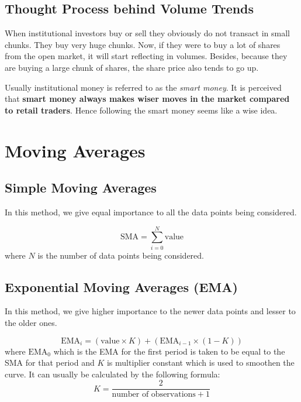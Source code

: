 
\subsection{Thought Process behind Volume Trends}
When institutional investors buy or sell they obviously do not transact in small chunks. They buy very huge chunks. Now, if they were to buy a lot of shares from the open market, it will start reflecting in volumes. Besides, because they are buying a large chunk of shares, the share price also tends to go up.

Usually institutional money is referred to as the \emph{smart money}. It is perceived that \textbf{smart money always makes wiser moves in the market compared to retail traders}. Hence following the smart money seems like a wise idea.

\section{Moving Averages}

\subsection{Simple Moving Averages}

In this method, we give equal importance to all the data points being considered.

\[
  \textrm{SMA} = \sum_{i=0}^{N} \textrm{value}
\]
where $N$ is the number of data points being considered.

\subsection{Exponential Moving Averages (EMA)}

In this method, we give higher importance to the newer data points and lesser to the older ones.

\[
  \textrm{EMA}_i = \left( \textrm{value} \times K \right) + \left( \textrm{EMA}_{i-1} \times (1-K) \right)
\]
where $\textrm{EMA}_0$ which is the EMA for the first period is taken to be equal to the SMA for that period and $K$ is multiplier constant which is used to smoothen the curve. It can usually be calculated by the following formula:
\[
  K = \frac{2}{\textrm{number of observations} + 1}
\]

